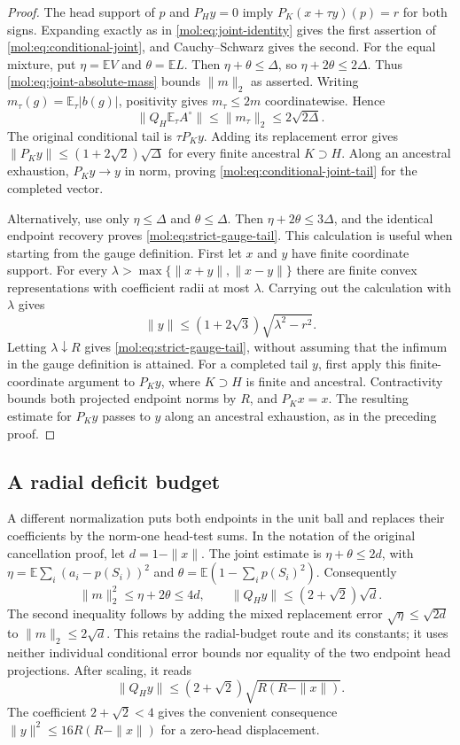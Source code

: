 \begin{proof}
The head support of $p$ and $P_Hy=0$ imply
$P_K(x+\tau y)(p)=r$ for both signs. Expanding exactly as in
\eqref{mol:eq:joint-identity} gives the first assertion of
\eqref{mol:eq:conditional-joint}, and Cauchy--Schwarz gives the second.
For the equal mixture, put $\eta=\mathbb EV$ and
$\theta=\mathbb EL$. Then $\eta+\theta\le\Delta$, so
$\eta+2\theta\le2\Delta$.  Thus
\eqref{mol:eq:joint-absolute-mass} bounds $\|m\|_2$ as asserted.
Writing $m_\tau(g)=\mathbb E_\tau|b(g)|$, positivity gives
$m_\tau\le2m$ coordinatewise.  Hence
\[
 \|Q_H\mathbb E_\tau A^\circ\|
 \le\|m_\tau\|_2\le2\sqrt{2\Delta}.
\]
The original conditional tail is $\tau P_Ky$. Adding its replacement
error gives $\|P_Ky\|\le(1+2\sqrt2)\sqrt\Delta$ for every
finite ancestral $K\supset H$. Along an ancestral exhaustion,
$P_Ky\to y$ in norm, proving \eqref{mol:eq:conditional-joint-tail}
for the completed vector.

Alternatively, use only $\eta\le\Delta$ and $\theta\le\Delta$.
Then $\eta+2\theta\le3\Delta$, and the identical endpoint recovery
proves \eqref{mol:eq:strict-gauge-tail}.  This calculation is useful
when starting from the gauge definition. First let $x$ and $y$ have
finite coordinate support. For every
$\lambda>\max\{\|x+y\|,\|x-y\|\}$ there are finite convex
representations with coefficient radii at most $\lambda$.  Carrying
out the calculation with $\lambda$ gives
\[
 \|y\|\le(1+2\sqrt3)\sqrt{\lambda^2-r^2}.
\]
Letting $\lambda\downarrow R$ gives
\eqref{mol:eq:strict-gauge-tail}, without assuming that the infimum
in the gauge definition is attained. For a completed tail $y$, first
apply this finite-coordinate argument to $P_Ky$, where $K\supset H$
is finite and ancestral. Contractivity bounds both projected endpoint
norms by $R$, and $P_Kx=x$. The resulting estimate for $P_Ky$ passes
to $y$ along an ancestral exhaustion, as in the preceding proof.
\end{proof}

\subsection{A radial deficit budget}

A different normalization puts both endpoints in the unit ball and
replaces their coefficients by the norm-one head-test sums.  In the
notation of the original cancellation proof, let
$d=1-\|x\|$.  The joint estimate is
$\eta+\theta\le2d$, with
$\eta=\mathbb E\sum_i(a_i-p(S_i))^2$ and
$\theta=\mathbb E(1-\sum_i p(S_i)^2)$.  Consequently
\begin{equation}\label{mol:eq:radial-budget}
 \|m\|_2^2\le\eta+2\theta\le4d,
 \qquad
 \|Q_Hy\|\le(2+\sqrt2)\sqrt d.
\end{equation}
The second inequality follows by adding the mixed replacement error
$\sqrt\eta\le\sqrt{2d}$ to $\|m\|_2\le2\sqrt d$.
This retains the radial-budget route and its constants; it uses
neither individual conditional error bounds nor equality of the two
endpoint head projections.  After scaling, it reads
\[
 \|Q_Hy\|\le(2+\sqrt2)\sqrt{R(R-\|x\|)}.
\]
The coefficient $2+\sqrt2<4$ gives the convenient consequence
$\|y\|^2\le16R(R-\|x\|)$ for a zero-head displacement.
